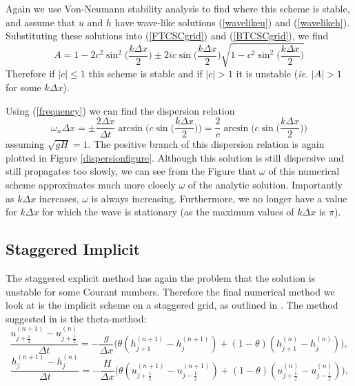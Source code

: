 \documentclass[a4paper, 10.8pt, notitlepage]{article}
\begin{document}
Again we use Von-Neumann stability analysis to find where this scheme is stable, and assume that $u$ and $h$ have wave-like solutions (\ref{wavelikeu}) and (\ref{wavelikeh}). Substituting these solutions into (\ref{FTCSCgrid}) and (\ref{BTCSCgrid}), we find
\begin{equation}
A = 1 - 2c^{2}\sin^{2}\bigg(\frac{k\Delta x}{2}\bigg) \pm 2ic\sin\bigg(\frac{k\Delta x}{2}\bigg) \sqrt{1 - c^{2}\sin^{2}\bigg(\frac{k\Delta x}{2}\bigg)}
\end{equation}
Therefore if $\lvert c \rvert \leq 1$ this scheme is stable and if $\lvert c \rvert > 1$ it is unstable  (\textit{ie.} $\vert A \rvert > 1$ for some $k\Delta x$).

Using (\ref{frequency}) we can find the dispersion relation
\begin{equation}
	\omega_{n} \Delta x = \pm\frac{2\Delta x}{\Delta t} \arcsin\bigg(c\sin\bigg(\frac{k\Delta x}{2}\bigg)\bigg) = \frac{2}{c} \arcsin\bigg(c\sin\bigg(\frac{k\Delta x}{2}\bigg)\bigg) 
\end{equation}
assuming $\sqrt{gH} = 1$. The positive branch of this dispersion relation is again plotted in Figure \ref{dispersionfigure}. Although this solution is still dispersive and still propagates too slowly, we can see from the Figure that $\omega$ of this numerical scheme approximates much more closely $\omega$ of the analytic solution. Importantly as $k\Delta x$ increases, $\omega$ is always increasing. Furthermore, we no longer have a value for $k\Delta x$ for which the wave is stationary (as the maximum values of $k\Delta x$ is $\pi$).

\subsection{Staggered Implicit}
The staggered explicit method has again the problem that the solution is unstable for some Courant numbers. Therefore the final numerical method we look at is the implicit scheme on a staggered grid, as outlined in \cite{implicit}. The method suggested in \cite{implicit} is the theta-method:
\begin{equation}
\frac{u_{j + \frac{1}{2}}^{(n + 1)} - u_{j + \frac{1}{2}}^{(n)}}{\Delta t} = -\frac{g}{\Delta x} \bigg(\theta (h_{j + 1}^{(n+ 1)} - h_{j}^{(n+ 1)}) + (1 - \theta) (h_{j + 1}^{(n)} - h_{j}^{(n)})\bigg),
\end{equation}
\begin{equation}
\frac{h_{j}^{(n + 1)} - h_{j}^{(n)}}{\Delta t} = -\frac{H}{\Delta x} \bigg(\theta (u_{j + \frac{1}{2}}^{(n+ 1)} - u_{j - \frac{1}{2}}^{(n+ 1)}) + (1 - \theta) (u_{j + \frac{1}{2}}^{(n)} - u_{j - \frac{1}{2}}^{(n)})\bigg).
\end{equation}
\end{document}
